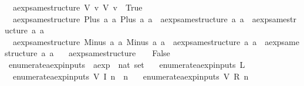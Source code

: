 \begin{isabellebody}
\ \ {\isachardoublequoteopen}aexp{\isacharunderscore}same{\isacharunderscore}structure\ {\isacharparenleft}V\ v{\isacharparenright}\ {\isacharparenleft}V\ v{\isacharprime}{\isacharparenright}\ {\isacharequal}\ True{\isachardoublequoteclose}\ {\isacharbar}\isanewline
\ \ {\isachardoublequoteopen}aexp{\isacharunderscore}same{\isacharunderscore}structure\ {\isacharparenleft}Plus\ a{}\ a{}{\isacharparenright}\ {\isacharparenleft}Plus\ a{}{\isacharprime}\ a{}{\isacharprime}{\isacharparenright}\ {\isacharequal}\ {\isacharparenleft}aexp{\isacharunderscore}same{\isacharunderscore}structure\ a{}\ a{}{\isacharprime}\ {\isasymand}\ aexp{\isacharunderscore}same{\isacharunderscore}structure\ a{}\ a{}{\isacharprime}{\isacharparenright}{\isachardoublequoteclose}\ {\isacharbar}\isanewline
\ \ {\isachardoublequoteopen}aexp{\isacharunderscore}same{\isacharunderscore}structure\ {\isacharparenleft}Minus\ a{}\ a{}{\isacharparenright}\ {\isacharparenleft}Minus\ a{}{\isacharprime}\ a{}{\isacharprime}{\isacharparenright}\ {\isacharequal}\ {\isacharparenleft}aexp{\isacharunderscore}same{\isacharunderscore}structure\ a{}\ a{}{\isacharprime}\ {\isasymand}\ aexp{\isacharunderscore}same{\isacharunderscore}structure\ a{}\ a{}{\isacharprime}{\isacharparenright}{\isachardoublequoteclose}\ {\isacharbar}\isanewline
\ \ {\isachardoublequoteopen}aexp{\isacharunderscore}same{\isacharunderscore}structure\ {\isacharunderscore}\ {\isacharunderscore}\ {\isacharequal}\ False{\isachardoublequoteclose}\isanewline
\isanewline
{}\isamarkupfalse%
\ enumerate{\isacharunderscore}aexp{\isacharunderscore}inputs\ {\isacharcolon}{\isacharcolon}\ {\isachardoublequoteopen}aexp\ {\isasymRightarrow}\ nat\ set{\isachardoublequoteclose}\ \isanewline
\ \ {\isachardoublequoteopen}enumerate{\isacharunderscore}aexp{\isacharunderscore}inputs\ {\isacharparenleft}L\ {\isacharunderscore}{\isacharparenright}\ {\isacharequal}\ {\isacharbraceleft}{\isacharbraceright}{\isachardoublequoteclose}\ {\isacharbar}\isanewline
\ \ {\isachardoublequoteopen}enumerate{\isacharunderscore}aexp{\isacharunderscore}inputs\ {\isacharparenleft}V\ {\isacharparenleft}I\ n{\isacharparenright}{\isacharparenright}\ {\isacharequal}\ {\isacharbraceleft}n{\isacharbraceright}{\isachardoublequoteclose}\ {\isacharbar}\isanewline
\ \ {\isachardoublequoteopen}enumerate{\isacharunderscore}aexp{\isacharunderscore}inputs\ {\isacharparenleft}V\ {\isacharparenleft}R\ n{\isacharparenright}{\isacharparenright}\ {\isacharequal}\ {\isacharbraceleft}{\isacharbraceright}{\isachardoublequoteclose}\ {\isacharbar}\isanewline

\end{isabellebody}
